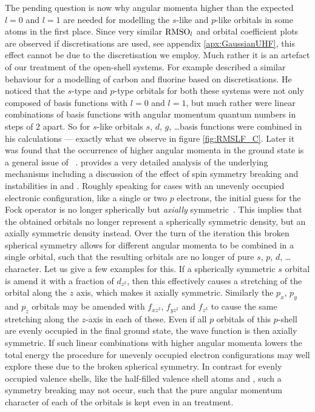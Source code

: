 \label{sec:IssuesUHF}
The pending question is now why angular momenta higher than the expected
$l=0$ and $l=1$ are needed for modelling the $s$-like and $p$-like orbitals
in some atoms in the first place.
Since very similar $\text{RMSO}_l$ and \RMS orbital coefficient plots
are observed if \cGTO discretisations are used, see appendix \vref{apx:GaussianUHF},
this effect cannot be due to the \CS discretisation we employ.
Much rather it is an artefact of our \UHF treatment of the open-shell systems.
For example \citet{Cook1981} described a similar behaviour
for a \UHF modelling of carbon and fluorine
based on \cGTO discretisations.
He noticed that the $s$-type and $p$-type \SCF orbitals
for both these systems were not only
composed of \cGTO basis functions with $l=0$ and $l=1$,
but much rather were linear combinations of basis functions with
angular momentum quantum numbers in steps of $2$ apart.
So for $s$-like \SCF orbitals $s$, $d$, $g$, \ldots basis functions
were combined in his calculations --- exactly what we observe in figure \ref{fig:RMSLF_C}.
Later it was found that the occurrence of higher angular momenta in
the ground state is a general issue of
\UHF~\cite{Fukutome1981,Cook1984,McWeeny1985}.
\citet{Fukutome1981} provides a very detailed analysis of the
underlying mechanisms including a discussion of the effect of
spin symmetry breaking and \HF instabilities in \UHF and \GUHF.
Roughly speaking for cases with an unevenly occupied electronic configuration,
like a single or two $p$ electrons,
the initial guess for the \UHF Fock operator is
no longer spherically but \emph{axially} symmetric~\cite{McWeeny1985}.
This implies that the obtained \SCF orbitals no longer represent
a spherically symmetric density, but an axially symmetric density instead.
Over the turn of the \UHF iteration
this broken spherical symmetry allows for different
angular momenta to be combined in a single orbital,
such that the resulting \SCF orbitals are no longer of pure
$s$, $p$, $d$, \ldots character.
Let us give a few examples for this.
If a spherically symmetric $s$ orbital is amend it with
a fraction of $d_{z^2}$, then this effectively causes a stretching
of the orbital along the $z$ axis,
which makes it axially symmetric.
Similarly the $p_x$, $p_y$ and $p_z$ orbitals
may be amended with $f_{xz^2}$, $f_{yz^2}$ and $f_{z^3}$
to cause the same stretching along the $z$-axis in each of these.
Even if all $p$ orbitals of this $p$-shell are evenly occupied in the final \HF
ground state, the wave function is then axially symmetric.
If such linear combinations with higher angular momenta
lowers the total \SCF energy
the \UHF procedure for unevenly occupied electron configurations
may well explore these due to the broken spherical symmetry.
In contrast for evenly occupied valence shells,
like the half-filled valence shell atoms  and ,
such a symmetry breaking may not occur,
such that the pure angular momentum character of each of the orbitals is kept
even in an \UHF treatment.

